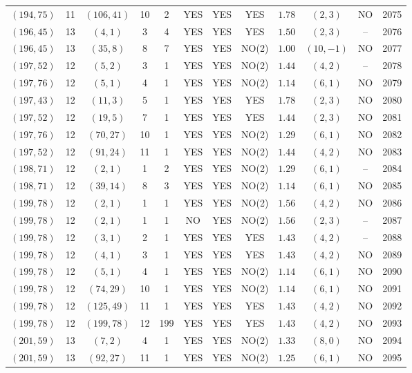 \begin{longtable}{|c|c|c|c|c|c|c|c|c|c|c|c|}
$(194,75)$ & 11 & $(106,41)$ & 10 & 2 & YES & YES & YES & $1.78$ & $(2,3)$ & NO & 2075\\
$(196,45)$ & 13 & $(4,1)$ & 3 & 4 & YES & YES & YES & $1.50$ & $(2,3)$ & -- & 2076\\
$(196,45)$ & 13 & $(35,8)$ & 8 & 7 & YES & YES & NO(2) & $1.00$ & $(10,-1)$ & NO & 2077\\
$(197,52)$ & 12 & $(5,2)$ & 3 & 1 & YES & YES & NO(2) & $1.44$ & $(4,2)$ & -- & 2078\\
$(197,76)$ & 12 & $(5,1)$ & 4 & 1 & YES & YES & NO(2) & $1.14$ & $(6,1)$ & NO & 2079\\
$(197,43)$ & 12 & $(11,3)$ & 5 & 1 & YES & YES & YES & $1.78$ & $(2,3)$ & NO & 2080\\
$(197,52)$ & 12 & $(19,5)$ & 7 & 1 & YES & YES & YES & $1.44$ & $(2,3)$ & NO & 2081\\
$(197,76)$ & 12 & $(70,27)$ & 10 & 1 & YES & YES & NO(2) & $1.29$ & $(6,1)$ & NO & 2082\\
$(197,52)$ & 12 & $(91,24)$ & 11 & 1 & YES & YES & NO(2) & $1.44$ & $(4,2)$ & NO & 2083\\
$(198,71)$ & 12 & $(2,1)$ & 1 & 2 & YES & YES & NO(2) & $1.29$ & $(6,1)$ & -- & 2084\\
$(198,71)$ & 12 & $(39,14)$ & 8 & 3 & YES & YES & NO(2) & $1.14$ & $(6,1)$ & NO & 2085\\
$(199,78)$ & 12 & $(2,1)$ & 1 & 1 & YES & YES & NO(2) & $1.56$ & $(4,2)$ & NO & 2086\\
$(199,78)$ & 12 & $(2,1)$ & 1 & 1 & NO & YES & NO(2) & $1.56$ & $(2,3)$ & -- & 2087\\
$(199,78)$ & 12 & $(3,1)$ & 2 & 1 & YES & YES & YES & $1.43$ & $(4,2)$ & -- & 2088\\
$(199,78)$ & 12 & $(4,1)$ & 3 & 1 & YES & YES & YES & $1.43$ & $(4,2)$ & NO & 2089\\
$(199,78)$ & 12 & $(5,1)$ & 4 & 1 & YES & YES & NO(2) & $1.14$ & $(6,1)$ & NO & 2090\\
$(199,78)$ & 12 & $(74,29)$ & 10 & 1 & YES & YES & NO(2) & $1.14$ & $(6,1)$ & NO & 2091\\
$(199,78)$ & 12 & $(125,49)$ & 11 & 1 & YES & YES & YES & $1.43$ & $(4,2)$ & NO & 2092\\
$(199,78)$ & 12 & $(199,78)$ & 12 & 199 & YES & YES & YES & $1.43$ & $(4,2)$ & NO & 2093\\
$(201,59)$ & 13 & $(7,2)$ & 4 & 1 & YES & YES & NO(2) & $1.33$ & $(8,0)$ & NO & 2094\\
$(201,59)$ & 13 & $(92,27)$ & 11 & 1 & YES & YES & NO(2) & $1.25$ & $(6,1)$ & NO & 2095\\

\end{longtable}
